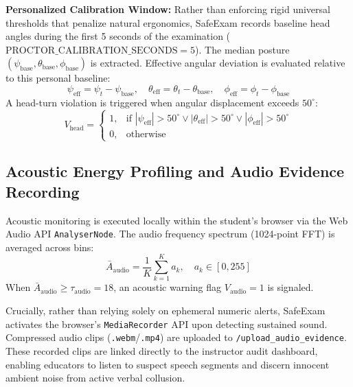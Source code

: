 \documentclass[conference]{IEEEtran}
\begin{document}
\textbf{Personalized Calibration Window:} Rather than enforcing rigid universal thresholds that penalize natural ergonomics, SafeExam records baseline head angles during the first 5 seconds of the examination ($\text{PROCTOR\_CALIBRATION\_SECONDS} = 5$). The median posture $(\psi_{\text{base}}, \theta_{\text{base}}, \phi_{\text{base}})$ is extracted. Effective angular deviation is evaluated relative to this personal baseline:
\begin{equation}
\psi_{\text{eff}} = \psi_t - \psi_{\text{base}}, \quad \theta_{\text{eff}} = \theta_t - \theta_{\text{base}}, \quad \phi_{\text{eff}} = \phi_t - \phi_{\text{base}}
\end{equation}
A head-turn violation is triggered when angular displacement exceeds $50^\circ$:
\begin{equation}
V_{\text{head}} = 
\begin{cases} 
1, & \text{if } |\psi_{\text{eff}}| > 50^\circ \lor |\theta_{\text{eff}}| > 50^\circ \lor |\phi_{\text{eff}}| > 50^\circ \\
0, & \text{otherwise}
\end{cases}
\end{equation}

\subsection{Acoustic Energy Profiling and Audio Evidence Recording}
Acoustic monitoring is executed locally within the student's browser via the Web Audio API \texttt{AnalyserNode}. The audio frequency spectrum (1024-point FFT) is averaged across bins:
\begin{equation}
\bar{A}_{\text{audio}} = \frac{1}{K} \sum_{k=1}^K a_k, \quad a_k \in [0, 255]
\end{equation}
When $\bar{A}_{\text{audio}} \ge \tau_{\text{audio}} = 18$, an acoustic warning flag $V_{\text{audio}} = 1$ is signaled.

Crucially, rather than relying solely on ephemeral numeric alerts, SafeExam activates the browser's \texttt{MediaRecorder} API upon detecting sustained sound. Compressed audio clips (\texttt{.webm}/\texttt{.mp4}) are uploaded to \texttt{/upload\_audio\_evidence}. These recorded clips are linked directly to the instructor audit dashboard, enabling educators to listen to suspect speech segments and discern innocent ambient noise from active verbal collusion.
\end{document}
